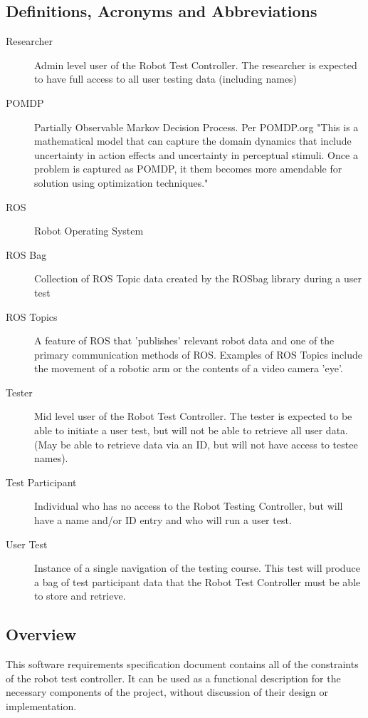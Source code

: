 \documentclass[onecolumn, draftclsnofoot,10pt, compsoc]{IEEEtran}
\begin{document}
\subsection{Definitions, Acronyms and Abbreviations}
\begin{description}
\item [Researcher] \hfill \break Admin level user of the Robot Test Controller. The researcher is expected to have full access to all user testing data (including names)
\item [POMDP] \hfill \break Partially Observable Markov Decision Process. Per POMDP.org "This is a mathematical model that can capture the domain dynamics that include uncertainty in action effects and uncertainty in perceptual stimuli. Once a problem is captured as POMDP, it them becomes more amendable for solution using optimization techniques." \cite{1}
\item [ROS] \hfill \break Robot Operating System
\item [ROS Bag] \hfill \break Collection of ROS Topic data created by the ROSbag library during a user test
\item [ROS Topics] \hfill \break A feature of ROS that 'publishes' relevant robot data and one of the primary communication methods of ROS. \cite{3} Examples of ROS Topics include the movement of a robotic arm or the contents of a video camera 'eye'. 
\item [Tester] \hfil \break Mid level user of the Robot Test Controller. The tester is expected to be able to initiate a user test, but will not be able to retrieve all user data. (May be able to retrieve data via an ID, but will not have access to testee names).
\item [Test Participant] \hfill \break Individual who has no access to the Robot Testing Controller, but will have a name and/or ID entry and who will run a user test.
\item [User Test] \hfill \break Instance of a single navigation of the testing course. This test will produce a bag of test participant data that the Robot Test Controller must be able to store and retrieve.
\end{description}

\subsection{Overview}
This software requirements specification document contains all of the constraints of the robot test controller. It can be used as a functional description for the necessary components of the project, without discussion of their design or implementation.
\end{document}
